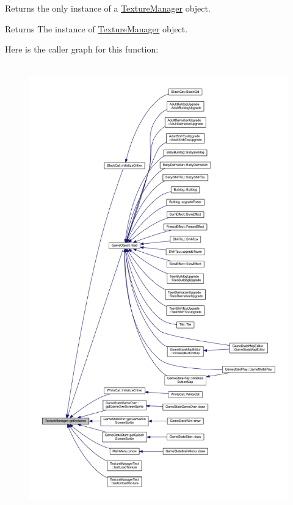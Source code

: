 Returns the only instance of a \hyperlink{class_texture_manager}{Texture\+Manager} object. 

\begin{DoxyReturn}{Returns}
The instance of \hyperlink{class_texture_manager}{Texture\+Manager} object. 
\end{DoxyReturn}


Here is the caller graph for this function\+:
\nopagebreak
\begin{figure}[H]
\begin{center}
\leavevmode
\includegraphics[height=550pt]{class_texture_manager_a0a6bc63e2f6fa7e1d0aee5b24cfa089a_icgraph}
\end{center}
\end{figure}


